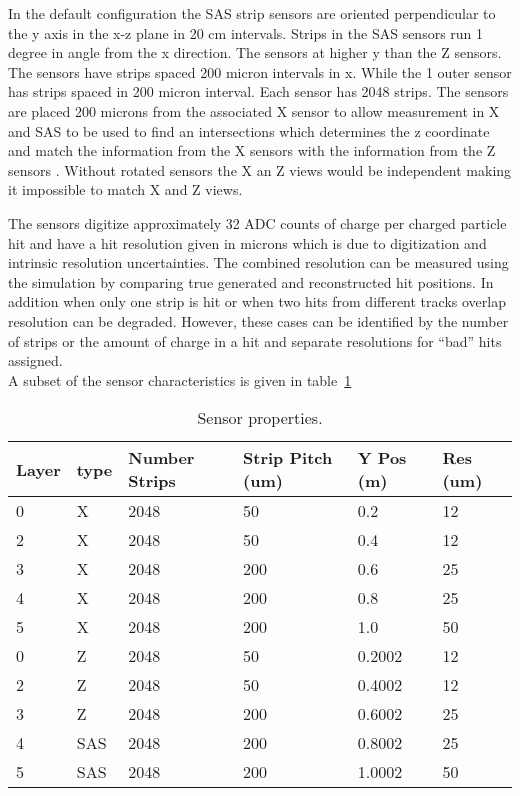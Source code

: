 \documentclass[aps,prd,superscriptaddress,floatfix]{revtex4}
\begin{document}
In the default configuration the SAS strip sensors are oriented perpendicular to the y axis in
the x-z plane in 20 cm intervals.  Strips in the SAS sensors run 1 degree in angle from the x
direction.  The sensors at higher y than the Z sensors.  The  sensors have strips spaced 200 micron
intervals in x. While the 1 outer sensor has strips spaced in 200 micron
interval.  Each sensor has 2048 strips.  The sensors are placed 200 microns from the associated X sensor to allow measurement in X
and SAS to be used to find an intersections which determines the z coordinate and match the information from the X sensors with the 
information from the Z sensors .  Without rotated sensors the X an Z views would be independent making it impossible to match X and Z
views.


The sensors digitize approximately 32 ADC counts of charge per charged
particle hit and have a hit resolution given in microns which is due to
digitization and intrinsic resolution uncertainties.  The combined resolution
can be measured using the simulation by comparing true generated and reconstructed
hit positions.  In addition when only one strip is hit or when two hits from
different tracks overlap resolution can be degraded.  However, these cases can
be identified by the number of strips or the amount of charge in a hit and separate
resolutions for ``bad'' hits assigned.
\\

A subset of the sensor characteristics is given in table~\ref{tab:detectorTable}
\\

\begin{table}
\caption{\label{tab:detectorTable} Sensor properties.}
\begin{tabular}{|l|l|l|l|l|l|}
\hline 
Layer & type & Number Strips & Strip Pitch (um) & Y Pos (m) & Res (um)\\
\hline
0 & X & 2048 & 50	& 0.2 & 12	 \\
2 & X & 2048 & 50	& 0.4 & 12	 \\
3 & X & 2048 & 200	& 0.6 & 25	 \\
4 & X & 2048 & 200	& 0.8 & 25	 \\
5 & X & 2048 & 200	& 1.0 & 50	 \\
0 & Z & 2048 & 50	& 0.2002 & 12	 \\
2 & Z & 2048 & 50	& 0.4002 & 12	 \\
3 & Z & 2048 & 200	& 0.6002 & 25	 \\
4 & SAS & 2048 & 200	& 0.8002 & 25	 \\
5 & SAS & 2048 & 200	& 1.0002 & 50	 \\
\hline
\end{tabular}
\end{table}
\end{document}
